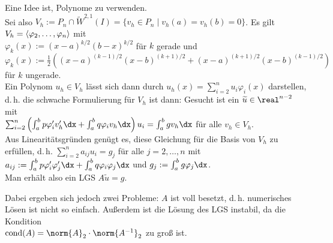 \begin{Bem}
    Eine Idee ist, Polynome zu verwenden.\\
    Sei also $V_h := P_n \cap \widetilde{W}^{2,1}(I) =
    \{v_h \in P_n \;|\; v_h(a) = v_h(b) = 0\}$.
    Es gilt $V_h = \left\langle{\varphi_2, \dotsc, \varphi_n}\right\rangle$ mit\\
    $\varphi_k(x) := (x - a)^{k/2} (b - x)^{k/2}$ für $k$ gerade und\\
    $\varphi_k(x) := \frac{1}{2} ((x - a)^{(k-1)/2} (x - b)^{(k+1)/2} +
    (x - a)^{(k+1)/2} (x - b)^{(k-1)/2})$ für $k$ ungerade.\\
    Ein Polynom $u_h \in V_h$ lässt sich dann durch
    $u_h(x) = \sum_{i=2}^n u_i \varphi_i(x)$ darstellen, d.\,h.
    die schwache Formulierung für $V_h$ ist dann:
    Gesucht ist ein $\widetilde{u} \in \real^{n-2}$ mit\\
    $\sum_{i=2}^n
    \left(\int_a^b p\varphi_i'v_h'\dx + \int_a^b q\varphi_iv_h\dx\right)u_i =
    \int_a^b gv_h\dx$ für alle $v_h \in V_h$.\\
    Aus Linearitätsgründen genügt es, diese Gleichung für die Basis von $V_h$
    zu erfüllen, d.\,h.
    $\sum_{i=2}^n a_{ij} u_i = g_j$ für alle $j = 2, \dotsc, n$ mit
    $a_{ij} := \int_a^b p\varphi_i'\varphi_j'\dx +
    \int_a^b q\varphi_i\varphi_j\dx$ und
    $g_j := \int_a^b g\varphi_j\dx$.\\
    Man erhält also ein LGS $A\widetilde{u} = g$.
    
    Dabei ergeben sich jedoch zwei Probleme:
    $A$ ist voll besetzt, d.\,h. numerisches Lösen ist nicht so einfach.
    Außerdem ist die Lösung des LGS instabil, da die Kondition\\
    $\cond(A) = \norm{A}_2 \cdot \norm{A^{-1}}_2$ zu groß ist.
\end{Bem}

\linie
\pagebreak

